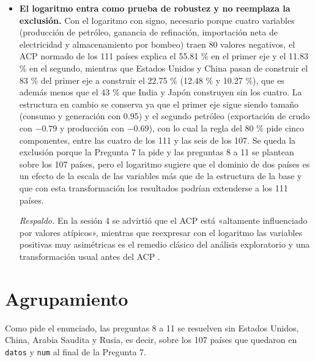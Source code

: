 \documentclass[oneside, openany, fontset=libertinus]{mitthesis}
\begin{document}
\begin{notas}
\begin{itemize}
  \emph{Respaldo.} En la sesión 3 se detectaron los atípicos
  multivariados con la distancia de Mahalanobis frente al cuantil 0.975
  de una \(\chi^2\) con tantos grados de libertad como variables (el
  ejemplo de clase, con cuatro variables, daba el mismo corte de 11.14),
  que es el procedimiento de \textcite[\S~4.7]{johnson2007}, mientras
  que en la sesión 4 se recomendó calcularla antes del ACP porque un
  punto lejano «va a jalonar» la dirección de máxima varianza.
\item
  \textbf{El logaritmo entra como prueba de robustez y no reemplaza la
  exclusión.} Con el logaritmo con signo, necesario porque cuatro
  variables (producción de petróleo, ganancia de refinación, importación
  neta de electricidad y almacenamiento por bombeo) traen 80 valores
  negativos, el ACP normado de los 111 países explica el 55.81 \% en el
  primer eje y el 11.83 \% en el segundo, mientras que Estados Unidos y
  China pasan de construir el 83 \% del primer eje a construir el 22.75
  \% (12.48 \% y 10.27 \%), que es además menos que el 43 \% que India y
  Japón construyen sin los cuatro. La estructura en cambio se conserva
  ya que el primer eje sigue siendo tamaño (consumo y generación con
  0.95) y el segundo petróleo (exportación de crudo con \(-0.79\) y
  producción con \(-0.69\)), con lo cual la regla del 80 \% pide cinco
  componentes, entre las cuatro de los 111 y las seis de los 107. Se
  queda la exclusión porque la Pregunta 7 la pide y las preguntas 8 a 11
  se plantean sobre los 107 países, pero el logaritmo sugiere que el
  dominio de dos países es un efecto de la escala de las variables más
  que de la estructura de la base y que con esta transformación los
  resultados podrían extenderse a los 111 países.

  \emph{Respaldo.} En la sesión 4 se advirtió que el ACP está «altamente
  influenciado por valores atípicos», mientras que reexpresar con el
  logaritmo las variables positivas muy asimétricas es el remedio
  clásico del análisis exploratorio \parencite{tukey1977} y una
  transformación usual antes del ACP
  \parencite[\S~14.2.3]{jolliffe2002}.
\end{itemize}

\end{notas}

\chapter{Agrupamiento}\label{agrupamiento}

Como pide el enunciado, las preguntas 8 a 11 se resuelven sin Estados
Unidos, China, Arabia Saudita y Rusia, es decir, sobre los 107 países
que quedaron en \texttt{datos} y \texttt{num} al final de la Pregunta 7.
\end{document}
